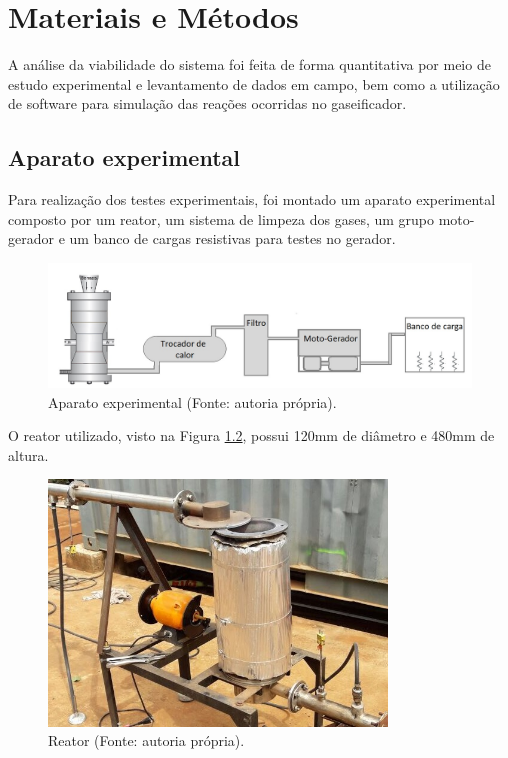 \chapter[Materiais e métodos]{Materiais e Métodos}

A análise da viabilidade do sistema foi feita de forma quantitativa por meio de estudo experimental e levantamento de dados em campo, bem como a utilização de software para simulação das reações ocorridas no gaseificador.

	
\section{Aparato experimental}

Para realização dos testes experimentais, foi montado um aparato experimental composto por um reator, um sistema de limpeza dos gases, um grupo moto-gerador e um banco de cargas resistivas para testes no gerador. 

\begin{figure}[!htb]
	\centering
	\includegraphics{aparato_experimental}
	\caption{Aparato experimental (Fonte: autoria própria).}
	\label{aparato_experimental}
\end{figure}


O reator utilizado, visto na Figura \ref{foto_reator}, possui 120mm de diâmetro e 480mm de altura.

\begin{figure}[!htb]
	\centering
	\includegraphics[width=9cm]{gaseificador_foto_3}
	\caption{Reator (Fonte: autoria própria).}
	\label{foto_reator}
\end{figure}

